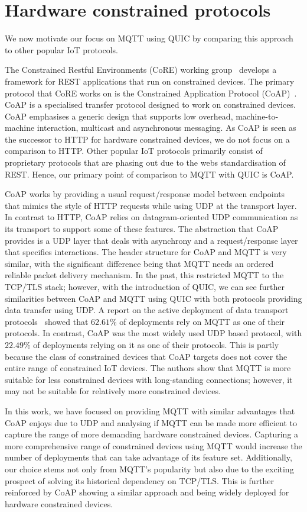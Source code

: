 \section{Hardware constrained protocols} \label{sec:iot-protos}

We now motivate our focus on MQTT using QUIC by comparing this approach to other popular IoT protocols.

The Constrained Restful Environments (CoRE) working group~\citep{core_wg} develops a framework for REST applications that run on constrained devices.
The primary protocol that CoRE works on is the Constrained Application Protocol (CoAP)~\citep{Shelby2014}.
CoAP is a specialised transfer protocol designed to work on constrained devices.
CoAP emphasises a generic design that supports low overhead, machine-to-machine interaction, multicast and asynchronous messaging.
As CoAP is seen as the successor to HTTP for hardware constrained devices, we do not focus on a comparison to HTTP.
Other popular IoT protocols primarily consist of proprietary protocols that are phasing out due to the webs standardisation of REST.
Hence, our primary point of comparison to MQTT with QUIC is CoAP.

CoAP works by providing a usual request/response model between endpoints that mimics the style of HTTP requests while using UDP at the transport layer.
In contrast to HTTP, CoAP relies on datagram-oriented UDP communication as its transport to support some of these features.
The abstraction that CoAP provides is a UDP layer that deals with asynchrony and a request/response layer that specifies interactions.
The header structure for CoAP and MQTT is very similar, with the significant difference being that MQTT needs an ordered reliable packet delivery mechanism.
In the past, this restricted MQTT to the TCP/TLS stack; however, with the introduction of QUIC, we can see further similarities between CoAP and MQTT using QUIC with both protocols providing data transfer using UDP.
A report on the active deployment of data transport protocols~\citep{tmobile_iot} showed that $62.61\%$ of deployments rely on MQTT as one of their protocols.
In contrast, CoAP was the most widely used UDP based protocol, with $22.49\%$ of deployments relying on it as one of their protocols.
This is partly because the class of constrained devices that CoAP targets does not cover the entire range of constrained IoT devices.
The authors show that MQTT is more suitable for less constrained devices with long-standing connections; however, it may not be suitable for relatively more constrained devices.

In this work, we have focused on providing MQTT with similar advantages that CoAP enjoys due to UDP and analysing if MQTT can be made more efficient to capture the range of more demanding hardware constrained devices.
Capturing a more comprehensive range of constrained devices using MQTT would increase the number of deployments that can take advantage of its feature set.
Additionally, our choice stems not only from MQTT's popularity but also due to the exciting prospect of solving its historical dependency on TCP/TLS.
This is further reinforced by CoAP showing a similar approach and being widely deployed for hardware constrained devices.
